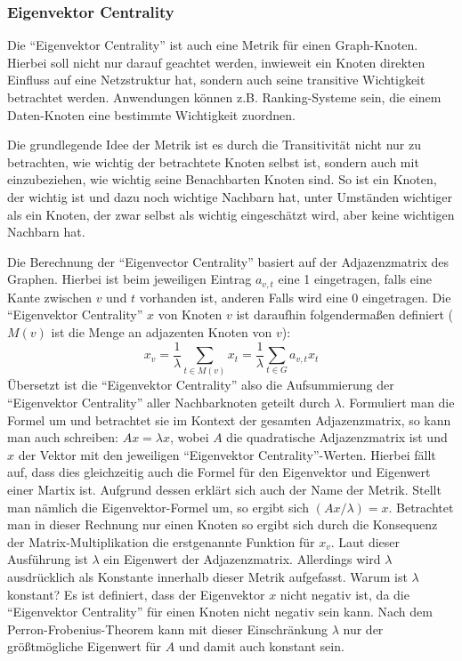 \documentclass[a4paper,12pt,ngerman,chapterprefix=false,listof=totoc,bibliography=totoc]{scrreprt}
\begin{document}
\subsubsection*{Eigenvektor Centrality}
{
Die "`Eigenvektor Centrality"' ist auch eine Metrik für einen Graph-Knoten. Hierbei soll nicht nur darauf geachtet werden, inwieweit ein Knoten direkten Einfluss auf eine Netzstruktur hat, sondern auch seine transitive Wichtigkeit betrachtet werden. Anwendungen können z.B. Ranking-Systeme sein, die einem Daten-Knoten eine bestimmte Wichtigkeit zuordnen. \cite{neo4j_eigenvector_2020}

Die grundlegende Idee der Metrik ist es durch die Transitivität nicht nur zu betrachten, wie wichtig der betrachtete Knoten selbst ist, sondern auch mit einzubeziehen, wie wichtig seine Benachbarten Knoten sind. So ist ein Knoten, der wichtig ist und dazu noch wichtige Nachbarn hat, unter Umständen wichtiger als ein Knoten, der zwar selbst als wichtig eingeschätzt wird, aber keine wichtigen Nachbarn hat.

Die Berechnung der "`Eigenvector Centrality"' basiert auf der Adjazenzmatrix des Graphen. Hierbei ist beim jeweiligen Eintrag \(a_{v,t}\) eine 1 eingetragen, falls eine Kante zwischen \(v\) und \(t\) vorhanden ist, anderen Falls wird eine 0 eingetragen. Die "`Eigenvektor Centrality"' \(x\) von Knoten \(v\) ist daraufhin folgendermaßen definiert (\(M(v)\) ist die Menge an adjazenten Knoten von \(v\)): \cite{bihari_eigenvector_2015}
\[
	x_v=\frac{1}{\lambda}\sum_{t\in M(v)}x_t=\frac{1}{\lambda}\sum_{t\in G}a_{v,t}x_t
\]
Übersetzt ist die "`Eigenvektor Centrality"' also die Aufsummierung der "`Eigenvektor Centrality"' aller Nachbarknoten geteilt durch \(\lambda\). Formuliert man die Formel um und betrachtet sie im Kontext der gesamten Adjazenzmatrix, so kann man auch schreiben: \(Ax=\lambda x\), wobei \(A\) die quadratische Adjazenzmatrix ist und \(x\) der Vektor mit den jeweiligen "`Eigenvektor Centrality"'-Werten. Hierbei fällt auf, dass dies gleichzeitig auch die Formel für den Eigenvektor und Eigenwert einer Martix ist. Aufgrund dessen erklärt sich auch der Name der Metrik. Stellt man nämlich die Eigenvektor-Formel um, so ergibt sich \((Ax/\lambda)=x\). Betrachtet man in dieser Rechnung nur einen Knoten so ergibt sich durch die Konsequenz der Matrix-Multiplikation die erstgenannte Funktion für \(x_v\). Laut dieser Ausführung ist \(\lambda\) ein Eigenwert der Adjazenzmatrix. Allerdings wird \(\lambda\) ausdrücklich als Konstante innerhalb dieser Metrik aufgefasst. Warum ist \(\lambda\) konstant? Es ist definiert, dass der Eigenvektor \(x\) nicht negativ ist, da die "`Eigenvektor Centrality"' für einen Knoten nicht negativ sein kann. Nach dem Perron-Frobenius-Theorem kann mit dieser Einschränkung \(\lambda\) nur der größtmögliche Eigenwert für \(A\) und damit auch konstant sein.

}
\end{document}

